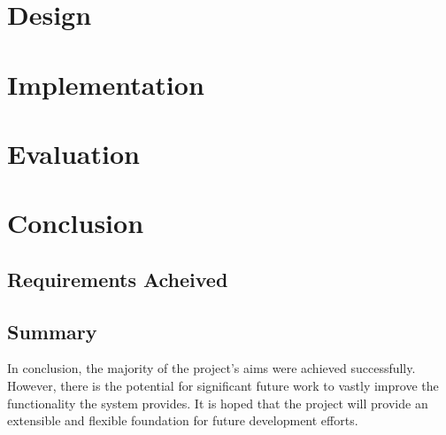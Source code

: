 \documentclass{l3proj}
\begin{document}




\chapter{Design}
\label{design}




\chapter{Implementation}
\label{implementation}




\chapter{Evaluation}
\label{evaluation}




\chapter{Conclusion}
\label{conclusion}

\section{Requirements Acheived}




\section{Summary}
In conclusion, the majority of the project's aims were achieved successfully.
However, there is the potential for significant future work to vastly improve the functionality the system provides.
It is hoped that the project will provide an extensible and flexible foundation for future development efforts.
\end{document}
